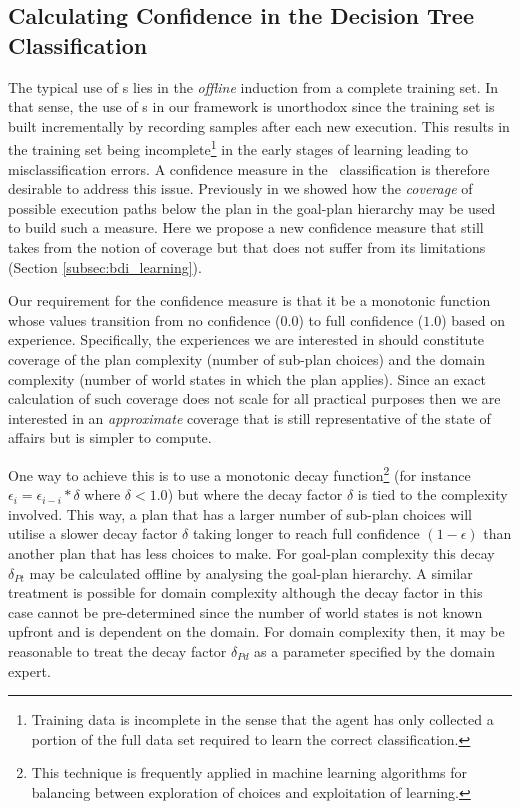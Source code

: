 \subsection{Calculating Confidence in the Decision Tree Classification}

The typical use of \dt s lies in the \textit{offline} induction from a complete training set. In that sense, the use of \dt s in our framework is unorthodox since the training set is built incrementally by recording samples after each new execution. This results in the training set being incomplete\footnote{Training data is incomplete in the sense that the agent has only collected a portion of the full data set required to learn the correct classification.} in the early stages of learning leading to misclassification errors. A confidence measure in the \dt\ classification is therefore desirable to address this issue. Previously in \cite{Singh:AAMAS10} we showed how the \textit{coverage} of possible execution paths below the plan in the goal-plan hierarchy may be used to build such a measure. Here we propose a new confidence measure that still takes from the notion of coverage but that does not suffer from its limitations (Section \ref{subsec:bdi_learning}).

Our requirement for the confidence measure is that it be a monotonic function whose values transition from no confidence ($0.0$) to full confidence ($1.0$) based on experience. Specifically, the experiences we are interested in should constitute coverage of the plan complexity (number of sub-plan choices) and the domain complexity (number of world states in which the plan applies). Since an exact calculation of such coverage does not scale for all practical purposes then we are interested in an \textit{approximate} coverage that is still representative of the state of affairs but is simpler to compute.

One way to achieve this is to use a monotonic decay function\footnote{This technique is frequently applied in machine learning algorithms for balancing between exploration of choices and exploitation of learning.} (for instance $\epsilon_i = \epsilon_{i-i} * \delta$ where $\delta < 1.0$) but where the decay factor $\delta$ is tied to the complexity involved. This way, a plan that has a larger number of sub-plan choices will utilise a slower decay factor $\delta$ taking longer to reach full confidence $(1-\epsilon)$ than another plan that has less choices to make. For goal-plan complexity this decay $\delta_{Pt}$ may be calculated offline by analysing the goal-plan hierarchy. A similar treatment is possible for domain complexity although the decay factor in this case cannot be pre-determined since the number of world states is not known upfront and is dependent on the domain. For domain complexity then, it may be reasonable to treat the decay factor $\delta_{Pd}$ as a parameter specified by the domain expert.

